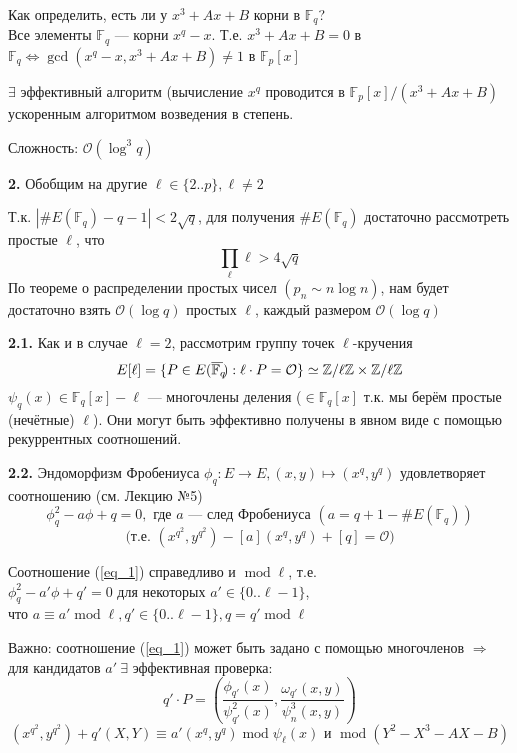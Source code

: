 \documentclass[12pt]{article}
\newcommand{\Z}{{{\mathbb Z}}}
\newcommand{\F}{{{\mathbb F}}}
\newcommand{\bigO}{\mathcal{O}}
\newcommand{\overbar}[1]{\overline{\mkern-0.0mu#1\mkern-4.0mu}}
\theoremstyle{definition}
\theoremstyle{definition}
\theoremstyle{definition}
\begin{document}
Как определить, есть ли у $x^3 + Ax+ B$ корни в $\F_q$?\\
Все элементы $\F_q$ — корни $x^q-x$. Т.е. $x^3+Ax+B=0$ в $\F_q \Leftrightarrow \gcd(x^q - x, x^3+Ax+B) \neq 1$ в $\F_p[x]$

$\exists$ эффективный алгоритм (вычисление $x^q$ проводится в $\F_p[x] / (x^3 + Ax+ B)$ ускоренным алгоритмом возведения в степень.

Сложность: $\bigO(\log^3 q)$


\textbf{2.} Обобщим на другие $\ell \in \{2..p\}, \ell \neq 2$

Т.к. $|\#E(\F_q) - q - 1| < 2\sqrt{q}$, для получения $\#E(\F_q)$ достаточно рассмотреть простые $\ell$, что 
\[
    \prod_\ell \ell > 4\sqrt{q}
\]
По теореме о распределении простых чисел $(p_n \sim n \log n)$, нам будет достаточно взять $\bigO(\log q)$ простых $\ell$, каждый размером $\bigO(\log q)$

\textbf{2.1.} Как и в случае $\ell = 2$, рассмотрим группу точек $\ell$-кручения 
\[
    E[\ell] = \{ P \in E(\overbar{\F_q}): \ell\cdot P = \bigO \} \simeq \Z/\ell\Z \times \Z/\ell\Z 
\]
$\psi_q(x) \in \F_q[x] - \ell$ — многочлены деления ($\in \F_q[x]$ т.к. мы берём простые (нечётные) $\ell$). Они могут быть эффективно получены в явном виде с помощью рекуррентных соотношений.

\textbf{2.2.} Эндоморфизм Фробениуса $\phi_q: E \rightarrow E, (x,y)\mapsto (x^q, y^q)$ удовлетворяет соотношению (см. Лекцию №5)
\begin{equation}
\label{eq_1}
    \phi_q^2 - a\phi + q = 0, \text{ где } a \text{ — след Фробениуса } (a = q+1-\#E(\F_q))
\end{equation}
\[
    \text{(т.е. } (x^{q^2}, y^{q^2}) - [a](x^q, y^q) + [q] = \bigO)
\]

Соотношение (\ref{eq_1}) справедливо и $\operatorname{mod} \ell$, т.е.\\
$\phi_q^2 - a'\phi + q' = 0$ для некоторых $a' \in \{0 .. \ell-1\}$,\\
что $a \equiv a' \operatorname{mod} \ell, q' \in \{0 .. \ell-1\}, q=q' \operatorname{mod} \ell$

Важно: соотношение (\ref{eq_1}) может быть задано с помощью многочленов $\Rightarrow$ для кандидатов $a'\ \exists$ эффективная проверка:
\[
    q'\cdot P = \left(\frac{\phi_{q'}(x)}{\psi^2_{q'}(x)}, \frac{\omega_{q'}(x,y)}{\psi^3_n(x,y)} \right)
\]
\[
    (x^{q^2}, y^{q^2}) + q'(X,Y) \equiv a'(x^q, y^q) \operatorname{mod} \psi_\ell(x) \text{ и } \operatorname{mod} (Y^2-X^3-AX-B)
\]
\end{document}
